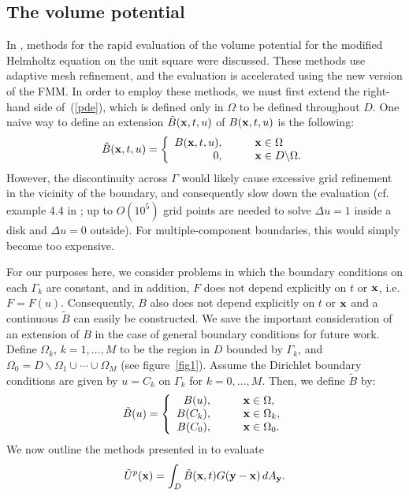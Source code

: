 \documentclass[preprint,12pt]{elsarticle}
\newcommand{\x}{{\bf x}}
\newcommand{\y}{{\bf y}}
\newcommand{\eqr}[1]{~(\ref{#1})}
\newcommand{\figr}[1]{figure~\ref{#1}}
\begin{document}
\subsection{The volume potential}
In \cite{modified:helmholtz}, methods for the rapid evaluation of the volume potential for the modified Helmholtz equation on the unit square were discussed.
These methods use adaptive mesh refinement, and the evaluation is accelerated using the new version of the FMM. 
In order to employ these methods, we must first extend the right-hand side of\eqr{pde}, which is defined only in $\Omega$ to be defined throughout $D$. 
One naive way to define an extension $\tilde{B}(\x,t,u)$ of $B(\x,t,u)$ is the following: 
\[
   \tilde{B}(\x,t,u) = \left\{ \begin{array}{rl}
                                       B(\x,t,u), & \qquad \x \in \Omega \\
                                       0, & \qquad \x \in D \backslash  \Omega.
                                    \end{array} \right.
\]
However, the discontinuity across $\Gamma$ would likely cause excessive grid refinement in the vicinity of the boundary, and consequently slow down the evaluation (cf. example 4.4 in \cite{greengard:ethridge}; up to $O(10^5)$ grid points are needed to solve $\Delta u=1$ inside a disk and $\Delta u = 0$ outside). 
For multiple-component boundaries, this would simply become too expensive. 

For our purposes here, we consider problems in which the boundary conditions on each $\Gamma_k$ are constant, and in addition, $F$ does not depend explicitly on $t$ or $\x$, i.e. $F = F(u)$. Consequently, $B$ also does not depend explicitly on $t$ or $\x$ and a continuous ${\tilde B}$ can easily be constructed. 
We save the important consideration of an extension of $B$ in the case of general boundary conditions for future work.
Define $\Omega_k$, $k=1,\ldots,M$ to be the region in $D$ bounded by $\Gamma_k$, and $\Omega_0 = D\backslash \Omega_1 \cup \cdots \cup \Omega_M$ (see \figr{fig1}). 
Assume the Dirichlet boundary conditions are given by $u=C_k$ on $\Gamma_k$ for $k=0,\ldots,M$. 
Then, we define $\tilde{B}$ by:
\[
   \tilde{B}(u) = \left\{ \begin{array}{rl}
                                       B(u), & \qquad \x \in \Omega, \\
                                       B(C_k), & \qquad \x \in \Omega_k, \\
                                       B(C_0), & \qquad \x \in \Omega_0.
                                    \end{array} \right.
\]
We now outline the methods presented in \cite{modified:helmholtz} to evaluate
\begin{equation}
   \tilde{U}^p(\x) = \int_D\tilde{B}(\x,t) G(\y - \x) \, dA_{\y}.   \label{volume_potential}
\end{equation}
\end{document}
